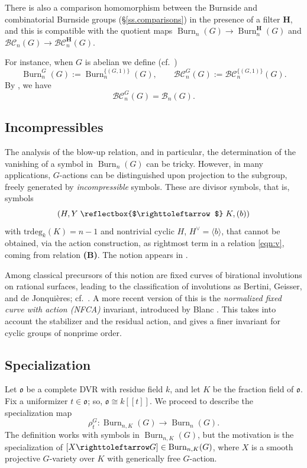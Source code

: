 \documentclass[12pt,reqno]{amsart}
\theoremstyle{plain}
\theoremstyle{remark}
\theoremstyle{definition}
\numberwithin{equation}{section}
\newcommand{\cB}{{\mathcal B}}
\newcommand{\BC}{{\mathcal B}{\mathcal C}}
\newcommand{\actsfromleft}{\mathrel{\reflectbox{$\righttoleftarrow$}}}
\newcommand{\actsfromright}{\righttoleftarrow}
\DeclareMathOperator{\Burn}{Burn}
\begin{document}
There is also a comparison homomorphism between the Burnside and combinatorial Burnside groups (\S \ref{ss.comparisons}) in the presence of a filter $\mathbf{H}$, and this is compatible with the quotient maps $\Burn_n(G)\to \Burn_n^{\mathbf{H}}(G)$ and
$\BC_n(G)\to \BC_n^{\mathbf{H}}(G)$.



For instance, when $G$ is abelian we define (cf.\ \cite[\S 8]{BnG})
\[ \Burn_n^G(G):=\Burn_n^{\{(G,1)\}}(G),\qquad
\BC_n^G(G):=\BC_n^{\{(G,1)\}}(G).
\]
By \cite[Exa.\ 8.8]{KT-struct}, we have
\[ \BC_n^G(G)=\cB_n(G). \]




\subsection{Incompressibles}
\label{sect:incomp}
The analysis of the blow-up relation, and in particular, the determination of the vanishing of a symbol in $\Burn_n(G)$ can be tricky.
However, in many applications, $G$-actions can be distinguished upon projection to the subgroup, freely generated by {\em incompressible} symbols. These are divisor symbols, that is, symbols 
$$
(H,Y\actsfromleft K,(b))
$$ 
with $\mathrm{trdeg}_k(K)=n-1$ and nontrivial cyclic $H$, $H^\vee=\langle b\rangle$, that cannot be obtained, via the action construction, as rightmost term in a relation \eqref{eqn:v}, coming from relation \textbf{(B)}.
The notion appears in \cite[Defn.\ 3.3]{KT-vector}.

Among classical precursors of this notion are fixed curves of birational involutions on rational surfaces, leading to the classification of involutions as Bertini, Geisser, and
de Jonqui\`eres; cf.\ \cite{baylebeauville}. A more recent version of this is the {\em normalized fixed curve with action (NFCA)} invariant, introduced by Blanc \cite{blancsubgroups}.
This takes into account the stabilizer and the residual action, and gives a finer invariant for cyclic groups of nonprime order.      










\subsection{Specialization}
Let $\mathfrak{o}$ be a complete DVR with residue field $k$,
and let $K$ be the fraction field of $\mathfrak{o}$.
Fix a uniformizer $t\in \mathfrak{o}$;
so, $\mathfrak{o}\cong k[[t]]$.
We proceed to describe the  specialization map
\[ \rho_t^G\colon \Burn_{n,K}(G)\to \Burn_n(G). \]
The definition works with symbols in $\Burn_{n,K}(G)$, but the motivation is the specialization of $[X\actsfromright G]\in \Burn_{n,K}(G)$, where $X$ is a smooth projective $G$-variety over $K$ with generically free $G$-action.
\end{document}
